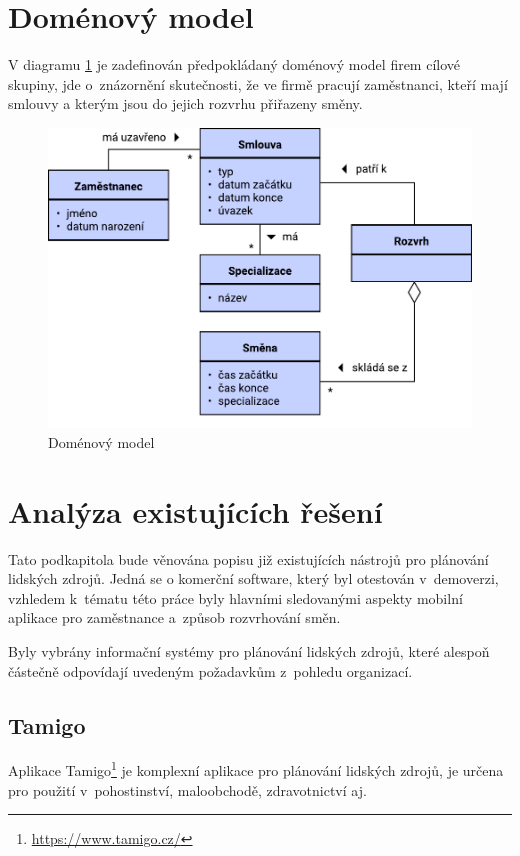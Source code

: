 \documentclass[twoside]{ctuthesis}
\begin{document}
\section{Doménový model}

V diagramu \ref{fig:domainmodel} je zadefinován předpokládaný doménový model firem cílové skupiny, jde o~znázornění skutečnosti, že ve firmě pracují zaměstnanci, kteří mají smlouvy a kterým jsou do jejich rozvrhu přiřazeny směny.

\begin{figure}[h]
	\includegraphics[scale=0.7]{img/domain-model.pdf}
	\caption{Doménový model}
	\label{fig:domainmodel}
\end{figure}

\section{Analýza existujících řešení}
\label{sec:existing}
Tato podkapitola bude věnována popisu již existujících nástrojů pro plánování lidských zdrojů. Jedná se o komerční software, který byl otestován v~demoverzi, vzhledem k~tématu této práce byly hlavními sledovanými aspekty mobilní aplikace pro zaměstnance a~způsob rozvrhování směn.

Byly vybrány informační systémy pro plánování lidských zdrojů, které alespoň částečně odpovídají uvedeným požadavkům z~pohledu organizací.

\subsection{Tamigo}
Aplikace Tamigo\footnote{\url{https://www.tamigo.cz/}} je komplexní aplikace pro plánování lidských zdrojů, je určena pro použití v~pohostinství, maloobchodě, zdravotnictví aj. \cite{tamigo2020reseni}
\end{document}
